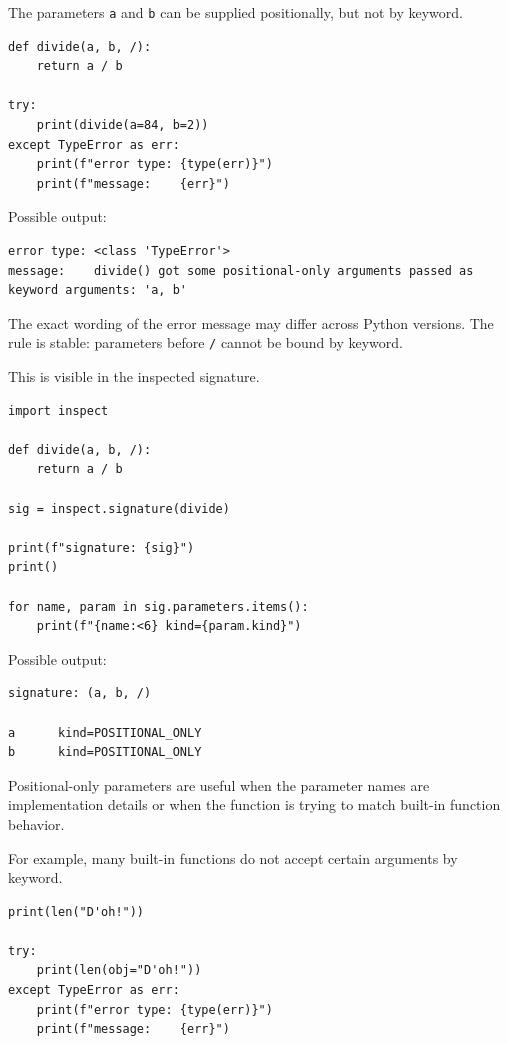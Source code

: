 The parameters \texttt{a} and \texttt{b} can be supplied positionally, but not by keyword.

\begin{verbatim}
def divide(a, b, /):
    return a / b

try:
    print(divide(a=84, b=2))
except TypeError as err:
    print(f"error type: {type(err)}")
    print(f"message:    {err}")
\end{verbatim}

Possible output:

\begin{verbatim}
error type: <class 'TypeError'>
message:    divide() got some positional-only arguments passed as keyword arguments: 'a, b'
\end{verbatim}

The exact wording of the error message may differ across Python versions. The rule is stable: parameters before \texttt{/} cannot be bound by keyword.

This is visible in the inspected signature.

\begin{verbatim}
import inspect

def divide(a, b, /):
    return a / b

sig = inspect.signature(divide)

print(f"signature: {sig}")
print()

for name, param in sig.parameters.items():
    print(f"{name:<6} kind={param.kind}")
\end{verbatim}

Possible output:

\begin{verbatim}
signature: (a, b, /)

a      kind=POSITIONAL_ONLY
b      kind=POSITIONAL_ONLY
\end{verbatim}

Positional-only parameters are useful when the parameter names are implementation details or when the function is trying to match built-in function behavior.

For example, many built-in functions do not accept certain arguments by keyword.

\begin{verbatim}
print(len("D'oh!"))

try:
    print(len(obj="D'oh!"))
except TypeError as err:
    print(f"error type: {type(err)}")
    print(f"message:    {err}")
\end{verbatim}

